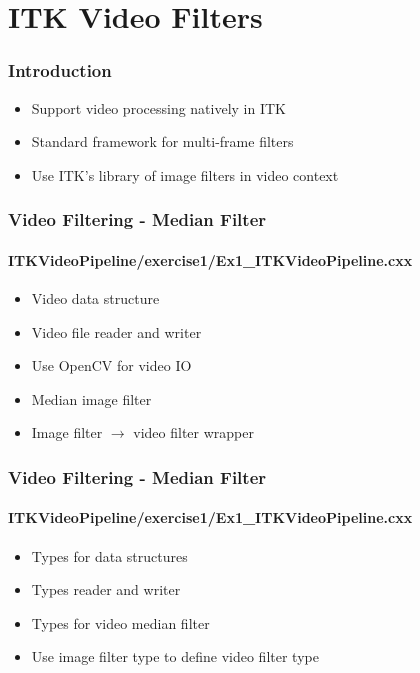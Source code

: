 \section{ITK Video Filters}



\begin{frame}
\frametitle{Introduction}
\begin{itemize}
\item Support video processing natively in ITK
\item Standard framework for multi-frame filters
\item Use ITK's library of image filters in video context
\end{itemize}
\end{frame}


{
\begin{frame}[fragile]
\frametitle{Video Filtering - Median Filter}
\framesubtitle{ITKVideoPipeline/exercise1/Ex1\_ITKVideoPipeline.cxx}

\begin{itemize}
\item Video data structure
\pause

\item Video file reader and writer
\item Use OpenCV for video IO
\pause

\item Median image filter
\item Image filter $\rightarrow$ video filter wrapper
\end{itemize}
\end{frame}
}

{
\begin{frame}[fragile]
\frametitle{Video Filtering - Median Filter}
\framesubtitle{ITKVideoPipeline/exercise1/Ex1\_ITKVideoPipeline.cxx}
\begin{itemize}
\item Types for data structures
\pause

\item Types reader and writer
\pause

\item Types for video median filter
\item Use image filter type to define video filter type
\end{itemize}
\end{frame}
}

